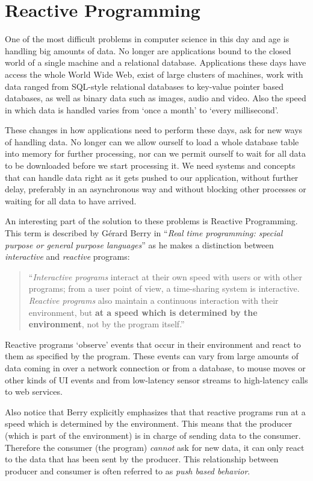 \section{Reactive Programming}
One of the most difficult problems in computer science in this day and age is handling big amounts of data. No longer are applications bound to the closed world of a single machine and a relational database. Applications these days have access the whole World Wide Web, exist of large clusters of machines, work with data ranged from SQL-style relational databases to key-value pointer based databases, as well as binary data such as images, audio and video. Also the speed in which data is handled varies from `once a month' to `every millisecond'.

These changes in how applications need to perform these days, ask for new ways of handling data. No longer can we allow ourself to load a whole database table into memory for further processing, nor can we permit ourself to wait for all data to be downloaded before we start processing it. We need systems and concepts that can handle data right as it gets pushed to our application, without further delay, preferably in an asynchronous way and without blocking other processes or waiting for all data to have arrived. \cite{meijer2012-YMIAD}

An interesting part of the solution to these problems is Reactive Programming. This term is described by G\'erard Berry in ``\textit{Real time programming: special purpose or general purpose languages}'' \cite{berry1991-Reactive} as he makes a distinction between \textit{interactive} and \textit{reactive} programs:

\begin{quote}
``\textit{Interactive programs} interact at their own speed with users or with other programs; from a user point of view, a time-sharing system is interactive. \textit{Reactive programs} also maintain a continuous interaction with their environment, but \textbf{at a speed which is determined by the environment}, not by the program itself.''
\end{quote}

Reactive programs `observe' events that occur in their environment and react to them as specified by the program. These events can vary from large amounts of data coming in over a network connection or from a database, to mouse moves or other kinds of UI events and from low-latency sensor streams to high-latency calls to web services.

Also notice that Berry explicitly emphasizes that that reactive programs run at a speed which is determined by the environment. This means that the producer (which is part of the environment) is in charge of sending data to the consumer. Therefore the consumer (the program) \emph{cannot} ask for new data, it can only react to the data that has been sent by the producer. This relationship between producer and consumer is often referred to as \textit{push based behavior}.

